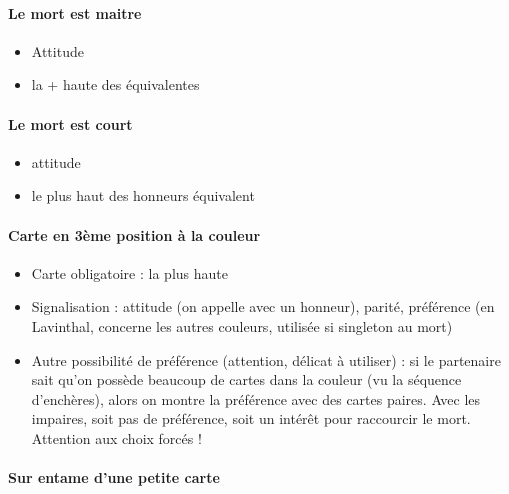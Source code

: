 \documentclass[a4paper]{article}
\begin{document}
\paragraph{Le mort est maitre}

\begin{itemize}
\item Attitude

\item la + haute des équivalentes

\end{itemize}

\paragraph{Le mort est court}

\begin{itemize}
\item attitude

\item le plus haut des honneurs équivalent

\end{itemize}

\paragraph{Carte en 3ème position à la couleur}

\begin{itemize}
\item Carte obligatoire : la plus haute

\item Signalisation : attitude (on appelle avec un honneur), parité, préférence (en Lavinthal, concerne les autres couleurs, utilisée si singleton au mort)

\item Autre possibilité de préférence (attention, délicat à utiliser) : si le partenaire sait qu’on possède beaucoup de cartes dans la couleur (vu la séquence d’enchères), alors on montre la préférence avec des cartes paires. Avec les impaires, soit pas de préférence, soit un intérêt pour raccourcir le mort. Attention aux choix forcés !

\end{itemize}

\paragraph{Sur entame d’une petite carte}
\end{document}
